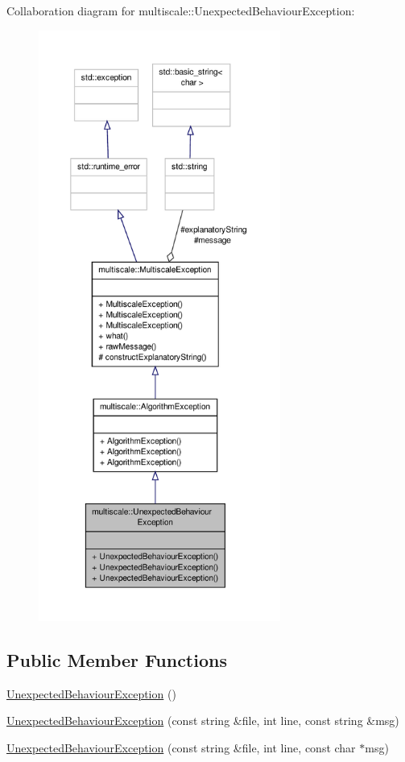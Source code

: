 Collaboration diagram for multiscale\-:\-:Unexpected\-Behaviour\-Exception\-:\nopagebreak
\begin{figure}[H]
\begin{center}
\leavevmode
\includegraphics[height=550pt]{classmultiscale_1_1UnexpectedBehaviourException__coll__graph}
\end{center}
\end{figure}
\subsection*{Public Member Functions}
\begin{DoxyCompactItemize}
\item 
\hyperlink{classmultiscale_1_1UnexpectedBehaviourException_ab7d8f94650407dd350e109e3362e3c4c}{Unexpected\-Behaviour\-Exception} ()
\item 
\hyperlink{classmultiscale_1_1UnexpectedBehaviourException_a99903f4c6c5f1746cb15f0ccf2c1233b}{Unexpected\-Behaviour\-Exception} (const string \&file, int line, const string \&msg)
\item 
\hyperlink{classmultiscale_1_1UnexpectedBehaviourException_adc0d1294e28ffd3eed251a60832d43bc}{Unexpected\-Behaviour\-Exception} (const string \&file, int line, const char $\ast$msg)
\end{DoxyCompactItemize}
